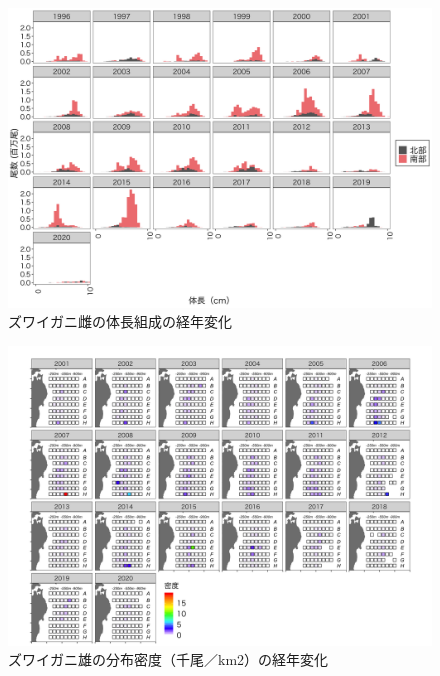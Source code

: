 \documentclass[11pt]{article} %
\begin{document}
\begin{linenumbers}
\begin{figure}[h]
  \centering
  \includegraphics[width = 14cm]{ズワイガニ雌length.png}
  \caption{ズワイガニ雌の体長組成の経年変化}
\end{figure}

\begin{figure}[h]
  \centering
  \includegraphics[width = 14cm]{ズワイガニ雄dens.png}
  \caption{ズワイガニ雄の分布密度（千尾／km2）の経年変化}
\end{figure}


\end{linenumbers}
\end{document}
